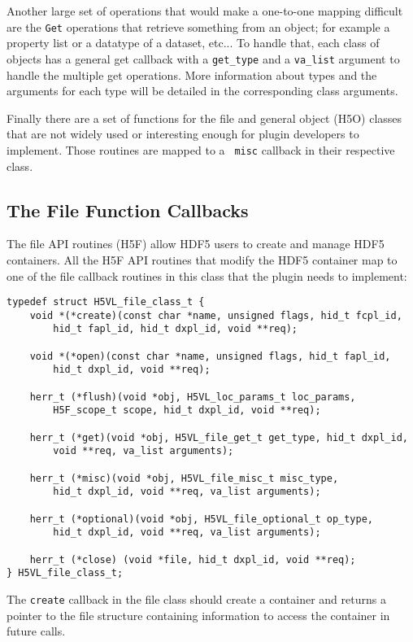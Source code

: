 Another large set of operations that would make a one-to-one mapping
difficult are the {\tt Get} operations that retrieve something from an
object; for example a property list or a datatype of a dataset,
etc... To handle that, each class of objects has a general get
callback with a {\tt get\_type} and a {\tt va\_list} argument to handle
the multiple get operations. More information about types and the
arguments for each type will be detailed in the corresponding class
arguments.

Finally there are a set of functions for the file and general object
(H5O) classes that are not widely used or interesting enough for
plugin developers to implement. Those routines are mapped to a {\tt
  misc} callback in their respective class.

\subsection{The File Function Callbacks}
The file API routines (H5F) allow HDF5 users to create and manage HDF5
containers. All the H5F API routines that modify the HDF5 container
map to one of the file callback routines in this class that the plugin
needs to implement:

\begin{lstlisting}
typedef struct H5VL_file_class_t {
    void *(*create)(const char *name, unsigned flags, hid_t fcpl_id,
        hid_t fapl_id, hid_t dxpl_id, void **req);

    void *(*open)(const char *name, unsigned flags, hid_t fapl_id, 
        hid_t dxpl_id, void **req);

    herr_t (*flush)(void *obj, H5VL_loc_params_t loc_params, 
        H5F_scope_t scope, hid_t dxpl_id, void **req);

    herr_t (*get)(void *obj, H5VL_file_get_t get_type, hid_t dxpl_id, 
        void **req, va_list arguments);

    herr_t (*misc)(void *obj, H5VL_file_misc_t misc_type, 
        hid_t dxpl_id, void **req, va_list arguments);

    herr_t (*optional)(void *obj, H5VL_file_optional_t op_type, 
        hid_t dxpl_id, void **req, va_list arguments);

    herr_t (*close) (void *file, hid_t dxpl_id, void **req);
} H5VL_file_class_t;
\end{lstlisting}

The {\tt create} callback in the file class should create a container
and returns a pointer to the file structure containing information to
access the container in future calls.

